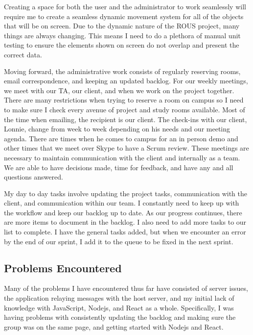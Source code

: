 \documentclass[draftclsnofoot, onecolumn, compsoc, 10pt]{IEEEtran}
\begin{document}
Creating a space for both the user and the administrator to work seamlessly will require me to create a seamless dynamic movement system for all of the objects that will be on screen. Due to the dynamic nature of the ROUS project, many things are always changing. This means I need to do a plethora of manual unit testing to ensure the elements shown on screen do not overlap and present the correct data.

Moving forward, the administrative work consists of regularly reserving rooms, email correspondence, and keeping an updated backlog. For our weekly meetings, we meet with our TA, our client, and when we work on the project together. There are many restrictions when trying to reserve a room on campus so I need to make sure I check every avenue of project and study rooms available. Most of the time when emailing, the recipient is our client. The check-ins with our client, Lonnie, change from week to week depending on his needs and our meeting agenda. There are times when he comes to campus for an in person demo and other times that we meet over Skype to have a Scrum review. These meetings are necessary to maintain communication with the client and internally as a team. We are able to have decisions made, time for feedback, and have any and all questions answered. 

My day to day tasks involve updating the project tasks, communication with the client, and communication within our team. I constantly need to keep up with the workflow and keep our backlog up to date. As our progress continues, there are more items to document in the backlog. I also need to add more tasks to our list to complete. I have the general tasks added, but when we encounter an error by the end of our sprint, I add it to the queue to be fixed in the next sprint. 

\subsection{Problems Encountered}
Many of the problems I have encountered thus far have consisted of server issues, the application relaying messages with the host server, and my initial lack of knowledge with JavaScript, Nodejs, and React as a whole. Specifically, I was having problems with consistently updating the backlog and making sure the group was on the same page, and getting started with Nodejs and React.
\end{document}
